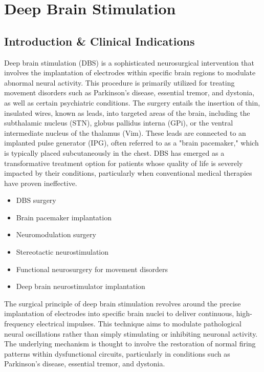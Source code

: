 \chapter{Deep Brain Stimulation}

\section*{Introduction \& Clinical Indications}
Deep brain stimulation (DBS) is a sophisticated neurosurgical intervention that involves the implantation of electrodes within specific brain regions to modulate abnormal neural activity. This procedure is primarily utilized for treating movement disorders such as Parkinson's disease, essential tremor, and dystonia, as well as certain psychiatric conditions. The surgery entails the insertion of thin, insulated wires, known as leads, into targeted areas of the brain, including the subthalamic nucleus (STN), globus pallidus interna (GPi), or the ventral intermediate nucleus of the thalamus (Vim). These leads are connected to an implanted pulse generator (IPG), often referred to as a "brain pacemaker," which is typically placed subcutaneously in the chest. DBS has emerged as a transformative treatment option for patients whose quality of life is severely impacted by their conditions, particularly when conventional medical therapies have proven ineffective.

\begin{itemize}
  \item DBS surgery
  \item Brain pacemaker implantation
  \item Neuromodulation surgery
  \item Stereotactic neurostimulation
  \item Functional neurosurgery for movement disorders
  \item Deep brain neurostimulator implantation
\end{itemize}

The surgical principle of deep brain stimulation revolves around the precise implantation of electrodes into specific brain nuclei to deliver continuous, high-frequency electrical impulses. This technique aims to modulate pathological neural oscillations rather than simply stimulating or inhibiting neuronal activity. The underlying mechanism is thought to involve the restoration of normal firing patterns within dysfunctional circuits, particularly in conditions such as Parkinson's disease, essential tremor, and dystonia. 

